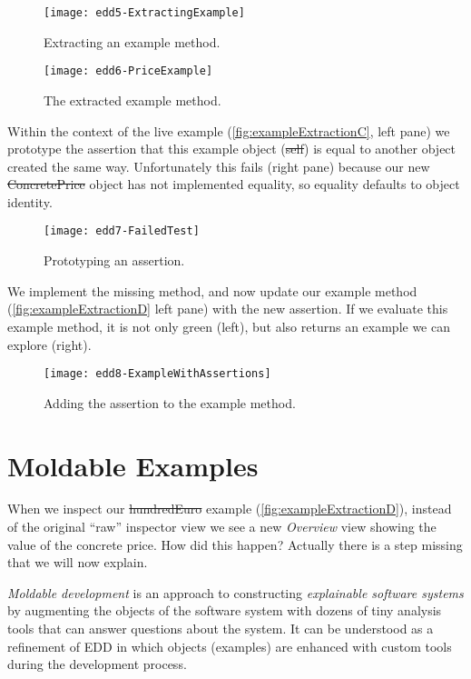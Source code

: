 \documentclass[acmsmall,screen,authorversion,nonacm]{acmart} %
\begin{document}
\begin{figure}[h]
  \texttt{[image: edd5-ExtractingExample]}
	\caption{Extracting an example method.}
  \label{fig:exampleExtractionA}
\end{figure}

\begin{figure}[h]
  \texttt{[image: edd6-PriceExample]}
	\caption{The extracted example method.}
  \label{fig:exampleExtractionB}
\end{figure}

Within the context of the live example (\autoref{fig:exampleExtractionC}, left pane) we prototype the assertion that this example object (\ie \st{self}) is equal to another object created the same way.
Unfortunately this fails (right pane) because our new \st{ConcretePrice} object has not implemented equality, so equality defaults to object identity.
\begin{figure}[h]
  \texttt{[image: edd7-FailedTest]}
	\caption{Prototyping an assertion.}
  \label{fig:exampleExtractionC}
\end{figure}

We implement the missing method, and now update our example method (\autoref{fig:exampleExtractionD} left pane) with the new assertion.
If we evaluate this example method, it is not only green (left), but also returns an example we can explore (right).

\begin{figure}[h]
  \texttt{[image: edd8-ExampleWithAssertions]}
	\caption{Adding the assertion to the example method.}
  \label{fig:exampleExtractionD}
\end{figure}

\section{Moldable Examples}\label{sec:moldable}

When we inspect our \st{hundredEuro} example (\autoref{fig:exampleExtractionD}), instead of the original ``raw'' inspector view we see a new \emph{Overview} view showing the value of the concrete price.
How did this happen?
Actually there is a step missing that we will now explain.

\emph{Moldable development} is an approach to constructing \emph{explainable software systems} by augmenting the objects of the software system with dozens of tiny analysis tools that can answer questions about the system.
It can be understood as a refinement of EDD in which objects (examples) are enhanced with custom tools during the development process.
\end{document}
